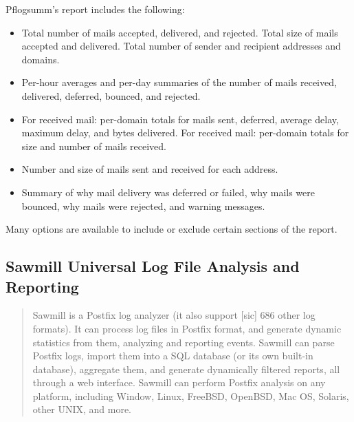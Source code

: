 Pflogsumm's report includes the following:

\begin{itemize}

    \item Total number of mails accepted, delivered, and rejected.  Total
        size of mails accepted and delivered.  Total number of sender and
        recipient addresses and domains.

    \item Per-hour averages and per-day summaries of the number of mails
        received, delivered, deferred, bounced, and rejected.

    \item For received mail: per-domain totals for mails sent, deferred,
        average delay, maximum delay, and bytes delivered.  For received
        mail: per-domain totals for size and number of mails received.

    \item Number and size of mails sent and received for each address.

    \item Summary of why mail delivery was deferred or failed, why mails
        were bounced, why mails were rejected, and warning messages.

\end{itemize}

Many options are available to include or exclude certain sections of the
report.

\subsection{Sawmill Universal Log File Analysis and Reporting}

\begin{quotation}

    Sawmill is a Postfix log analyzer (it also support [sic] 686 other log
    formats).  It can process log files in Postfix format, and generate
    dynamic statistics from them, analyzing and reporting events.  Sawmill
    can parse Postfix logs, import them into a SQL database (or its own
    built-in database), aggregate them, and generate dynamically filtered
    reports, all through a web interface.  Sawmill can perform Postfix
    analysis on any platform, including Window, Linux, FreeBSD, OpenBSD,
    Mac OS, Solaris, other UNIX, and more.

\end{quotation}

